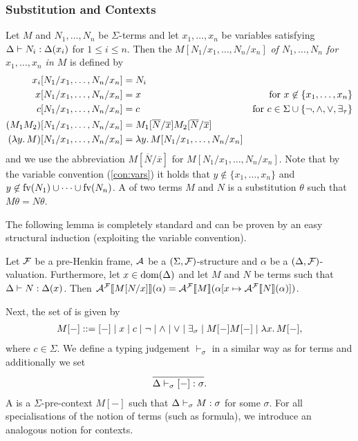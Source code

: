\documentclass[a4paper,twoside,notitlepage,openright,11pt]{report}
\begin{document}
\subsubsection{Substitution and Contexts}
Let $M$ and $N_1,\ldots,N_n$ be $\Sigma$-terms and let $x_1,\ldots,x_n$ be variables satisfying $\Delta\vdash N_i:\Delta(x_i)$ for $1\leq i\leq n$. Then the  $M[N_1/x_1,\ldots,N_n/x_n]$ \emph{of $N_1,\ldots,N_n$ for $x_1,\ldots,x_n$ in $M$} is defined by
\begin{align*}
  x_i[N_1/x_1,\ldots,N_n/x_n]&=N_i\\
  x[N_1/x_1,\ldots,N_n/x_n]&=x&\text{for }x\not\in\{x_1,\ldots,x_n\}\\
  c[N_1/x_1,\ldots,N_n/x_n]&=c&\text{for }c\in\Sigma\cup\{\neg,\land,\lor,\exists_\tau\}\\
  (M_1M_2)[N_1/x_1,\ldots,N_n/x_n]&=M_1[\overline N/\overline x]M_2[\overline N/\overline x]\\
  (\lambda y\ldotp M)[N_1/x_1,\ldots,N_n/x_n]&=\lambda y\ldotp M[N_1/x_1,\ldots,N_n/x_n]
\end{align*}
and we use the abbreviation $M[\overline N/\overline x]$ for $M[N_1/x_1,\ldots,N_n/x_n]$.
Note that by the variable convention (\cref{con:vars}) it holds that $y\nin\{x_1,\ldots,x_n\}$ and $y\not\in\operatorname{fv}(N_1)\cup\cdots\cup\operatorname{fv}(N_n)$. A  of two terms $M$ and $N$ is a substitution $\theta$ such that $M\theta=N\theta$.

The following lemma is completely standard and can be proven by an easy structural induction (exploiting the variable convention).
\begin{lemma}[Substitution]
  \label{lem:substitution}
  Let $\mathcal F$ be a pre-Henkin frame, $\mathcal A$ be a $(\Sigma,\mathcal F)$-structure and $\alpha$ be a $(\Delta,\mathcal F)$-valuation. Furthermore, let $x\in\operatorname{dom}(\Delta)$ and let $M$ and $N$ be terms such that $\Delta\vdash N:\Delta(x)$.
  Then ${\mathcal A}^\mathcal F\llbracket M[N/x]\rrbracket(\alpha)={\mathcal A}^\mathcal F\llbracket M\rrbracket(\alpha[x\mapsto{\mathcal A}^\mathcal F\llbracket N\rrbracket(\alpha)])$.
\end{lemma}


Next, the set of  is given by
\begin{align*}
  M[-]::=[-]\mid x\mid c\mid\neg\mid\land\mid\lor\mid\exists_\sigma\mid M[-]M[-]\mid\lambda x\ldotp M[-],
\end{align*}
where $c\in\Sigma$. We define a typing judgement $\vdash_\sigma$ in a similar way as for terms and additionally we set
\begin{align*}
  \infer{\Delta\vdash_\sigma[-]\from\sigma}{}.
\end{align*}
A  is a $\Sigma$-pre-context $M[-]$ such that $\Delta\vdash_\sigma M:\sigma$ for some $\sigma$. For all specialisations of the notion of terms (such as formula), we introduce an analogous notion for contexts.
\end{document}
